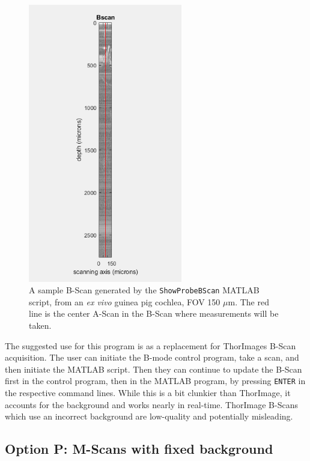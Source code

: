 \documentclass{article}
\begin{document}
\begin{figure}[!h]
	\centering
	\includegraphics[width=0.6\textwidth]{Data for Probe Writeup/BScan fig update.png}
	\caption{A sample B-Scan generated by the \texttt{ShowProbeBScan} MATLAB script, from an \textit{ex vivo} guinea pig cochlea, FOV 150 $\mu$m. The red line is the center A-Scan in the B-Scan where measurements will be taken.}\label{bex}
\end{figure}

\par{The suggested use for this program is as a replacement for ThorImages B-Scan acquisition. The user can initiate the B-mode control program, take a scan, and then initiate the MATLAB script. Then they can continue to update the B-Scan first in the control program, then in the MATLAB program, by pressing \texttt{ENTER} in the respective command lines. While this is a bit clunkier than ThorImage, it accounts for the background and works nearly in real-time. ThorImage B-Scans which use an incorrect background are low-quality and potentially misleading.}

\subsection{Option P: M-Scans with fixed background}
\end{document}
